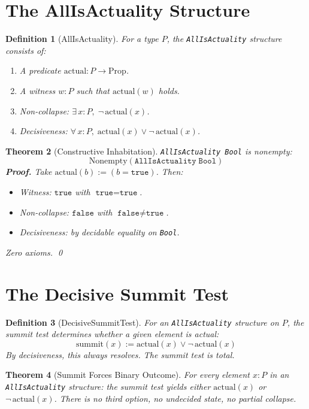 \documentclass[12pt,a4paper]{article}
\newtheorem{theorem}{Theorem}[section]
\newtheorem{definition}[theorem]{Definition}
\begin{document}
\section{The AllIsActuality Structure}

\begin{definition}[AllIsActuality]
For a type $P$, the \texttt{AllIsActuality} structure consists of:
\begin{enumerate}
    \item A predicate $\text{actual} : P \to \text{Prop}$.
    \item A witness $w : P$ such that $\text{actual}(w)$ holds.
    \item Non-collapse: $\exists\, x : P,\; \neg\, \text{actual}(x)$.
    \item Decisiveness: $\forall\, x : P,\; \text{actual}(x) \lor \neg\, \text{actual}(x)$.
\end{enumerate}
\end{definition}

\begin{theorem}[Constructive Inhabitation]\label{thm:inhabit}
\texttt{AllIsActuality Bool} is nonempty:
\[
\text{Nonempty}(\texttt{AllIsActuality}\; \texttt{Bool})
\]
\textbf{Proof.} Take $\text{actual}(b) := (b = \texttt{true})$. Then:
\begin{itemize}
    \item Witness: $\texttt{true}$ with $\texttt{true} = \texttt{true}$.
    \item Non-collapse: $\texttt{false}$ with $\texttt{false} \neq \texttt{true}$.
    \item Decisiveness: by decidable equality on \texttt{Bool}.
\end{itemize}
Zero axioms. \qed
\end{theorem}

\section{The Decisive Summit Test}

\begin{definition}[DecisiveSummitTest]
For an \texttt{AllIsActuality} structure on $P$, the summit test determines
whether a given element is actual:
\[
\text{summit}(x) := \text{actual}(x) \lor \neg\, \text{actual}(x)
\]
By decisiveness, this always resolves. The summit test is total.
\end{definition}

\begin{theorem}[Summit Forces Binary Outcome]\label{thm:summit}
For every element $x : P$ in an \texttt{AllIsActuality} structure:
the summit test yields either $\text{actual}(x)$ or $\neg\, \text{actual}(x)$.
There is no third option, no undecided state, no partial collapse.
\end{theorem}
\end{document}
